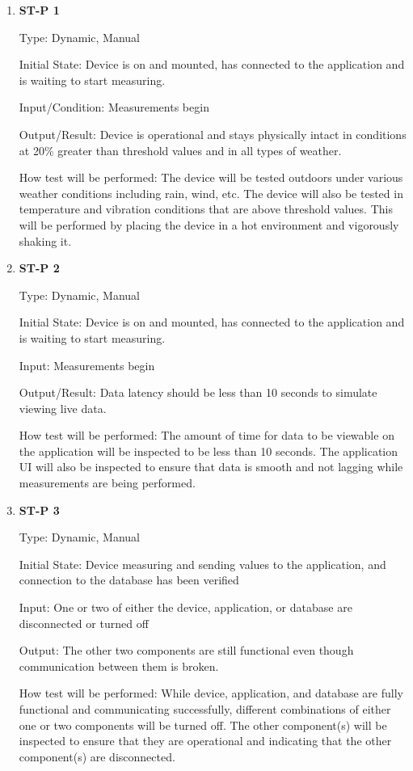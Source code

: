 \documentclass[12pt, titlepage]{article}
\begin{document}
\begin{enumerate}

\item{\bf{ST-P 1}}

Type: Dynamic, Manual
					
Initial State: Device is on and mounted, has connected to the application and is waiting to start measuring.
					
Input/Condition: Measurements begin
					
Output/Result: Device is operational and stays physically intact in conditions at 20\% greater than threshold values and in all types of weather.
					
How test will be performed: The device will be tested outdoors under various weather conditions including rain, wind, etc.
The device will also be tested in temperature and vibration conditions that are above threshold values. This will be performed by placing the device in a hot environment
and vigorously shaking it.
					
\item{\bf{ST-P 2}}

Type: Dynamic, Manual
					
Initial State: Device is on and mounted, has connected to the application and is waiting to start measuring.
					
Input: Measurements begin
					
Output/Result: Data latency should be less than 10 seconds to simulate viewing live data.
					
How test will be performed: The amount of time for data to be viewable on the application will be inspected to be less than 10 seconds.
The application UI will also be inspected to ensure that data is smooth and not lagging while measurements are being performed.

\item{\bf{ST-P 3}}

Type: Dynamic, Manual
					
Initial State: Device measuring and sending values to the application, and connection to the database has been verified
					
Input: One or two of either the device, application, or database are disconnected or turned off
					
Output: The other two components are still functional even though communication between them is broken.
					
How test will be performed: While device, application, and database are fully functional and communicating successfully, different combinations of either one or two components
will be turned off. The other component(s) will be inspected to ensure that they are operational and indicating that the other component(s) are disconnected.

\end{enumerate}
\end{document}
